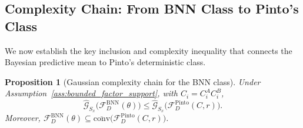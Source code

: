 \documentclass{article}
\theoremstyle{plain}
\newtheorem{proposition}[theorem]{Proposition}
\theoremstyle{definition}
\theoremstyle{remark}
\begin{document}
\subsection{Complexity Chain: From BNN Class to Pinto's Class}\label{app:gaussian_complexity:complexity_chain}

We now establish the key inclusion and complexity inequality that connects the Bayesian predictive mean to Pinto's deterministic class.

\begin{proposition}[Gaussian complexity chain for the BNN class]
\label{prop:complexity_chain_class}
Under Assumption~\ref{ass:bounded_factor_support}, with $C_i=C_i^A C_i^B$,
\[
\hat{\mathcal{G}}_{S_x}\big(\mathcal{F}^{\mathrm{BNN}}_D(\theta)\big)
\le
\hat{\mathcal{G}}_{S_x}\big(\mathcal{F}^{\mathrm{Pinto}}_D(C,r)\big).
\]
Moreover, $\mathcal{F}^{\mathrm{BNN}}_D(\theta)\subseteq \overline{\mathrm{conv}}\!\big(\mathcal{F}^{\mathrm{Pinto}}_D(C,r)\big)$.
\end{proposition}
\end{document}
